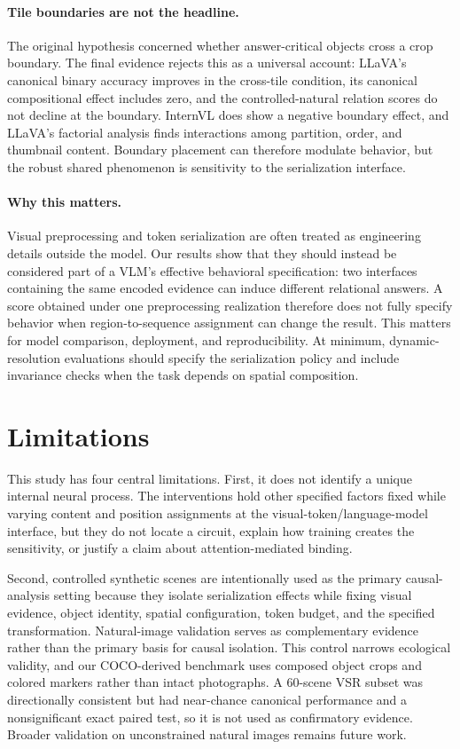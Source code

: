 \documentclass[10pt,twocolumn,letterpaper]{article}
\begin{document}
\paragraph{Tile boundaries are not the headline.}
The original hypothesis concerned whether answer-critical objects cross a crop boundary.
The final evidence rejects this as a universal account: LLaVA's canonical binary accuracy improves in the cross-tile condition, its canonical compositional effect includes zero, and the controlled-natural relation scores do not decline at the boundary.
InternVL does show a negative boundary effect, and LLaVA's factorial analysis finds interactions among partition, order, and thumbnail content.
Boundary placement can therefore modulate behavior, but the robust shared phenomenon is sensitivity to the serialization interface.

\paragraph{Why this matters.}
Visual preprocessing and token serialization are often treated as engineering details outside the model.
Our results show that they should instead be considered part of a VLM's effective behavioral specification: two interfaces containing the same encoded evidence can induce different relational answers.
A score obtained under one preprocessing realization therefore does not fully specify behavior when region-to-sequence assignment can change the result.
This matters for model comparison, deployment, and reproducibility.
At minimum, dynamic-resolution evaluations should specify the serialization policy and include invariance checks when the task depends on spatial composition.

\section{Limitations}

This study has four central limitations.
First, it does not identify a unique internal neural process.
The interventions hold other specified factors fixed while varying content and position assignments at the visual-token/language-model interface, but they do not locate a circuit, explain how training creates the sensitivity, or justify a claim about attention-mediated binding.

Second, controlled synthetic scenes are intentionally used as the primary causal-analysis setting because they isolate serialization effects while fixing visual evidence, object identity, spatial configuration, token budget, and the specified transformation.
Natural-image validation serves as complementary evidence rather than the primary basis for causal isolation.
This control narrows ecological validity, and our COCO-derived benchmark uses composed object crops and colored markers rather than intact photographs.
A 60-scene VSR subset was directionally consistent but had near-chance canonical performance and a nonsignificant exact paired test, so it is not used as confirmatory evidence.
Broader validation on unconstrained natural images remains future work.
\end{document}
